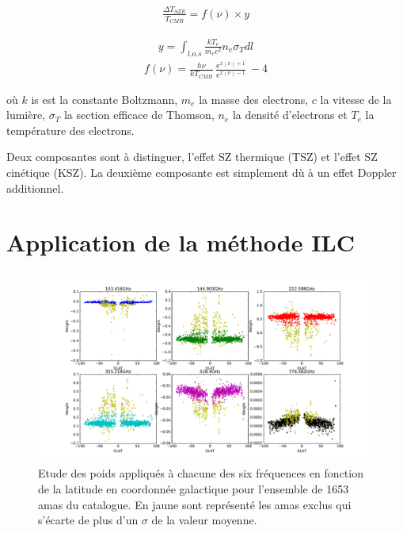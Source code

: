 \documentclass[a4paper,11pt]{article}
\DeclareMathOperator{\e}{e}
\begin{document}
\begin{align*}
  \frac{\Delta T_{SZE}}{T_{CMB}} = f(\nu) \times  y
\end{align*}

\begin{multicols}{2}\noindent
\begin{align*}
  y = \int_{l.o.s} \frac{kT_e}{m_e c^2} n_e \sigma_T dl 
\end{align*}
\begin{align*}
  f(\nu) = \frac{h \nu}{k T_{CMB}} \frac{\e^{x(\nu) + 1}}{\e^{x(\nu)
  -1}} - 4
\end{align*}
\end{multicols}

où $k$ is est la constante Boltzmann, $m_e$ la masse des electrons, $c$
la vitesse de la lumière, $\sigma_T$ la section efficace de Thomson, 
$n_e$ la densité d'electrons et $T_e$ la température des electrons.

Deux composantes sont à distinguer, l'effet SZ thermique (TSZ) et
l'effet SZ cinétique (KSZ). La deuxième composante est simplement dù à un effet
Doppler additionnel. 

\section{Application de la méthode ILC}

\begin{figure}[b!]
  \centering
  \label{w_lat}
  \includegraphics[width=6in]{w_lat.pdf}
  \caption{Etude des poids appliqués à chacune des six fréquences en
    fonction de la latitude en coordonnée galactique pour
  l'ensemble de 1653 amas du catalogue. En jaune sont représenté les
  amas exclus qui s'écarte de plus d'un $\sigma$ de la valeur moyenne.}
\end{figure}
\end{document}
